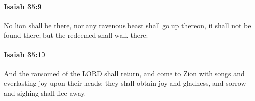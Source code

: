 		\paragraph{Isaiah 35:9} %
			\label{ISAIAH-35-9}

			No lion shall be there, nor any ravenous beast shall go up thereon, it shall not be found there; but the redeemed shall walk there:


		\paragraph{Isaiah 35:10} %
			\label{ISAIAH-35-10}

			And the ransomed of the LORD shall return, and come to Zion with songs and everlasting joy upon their heads: they shall obtain joy and gladness, and sorrow and sighing shall flee away.

